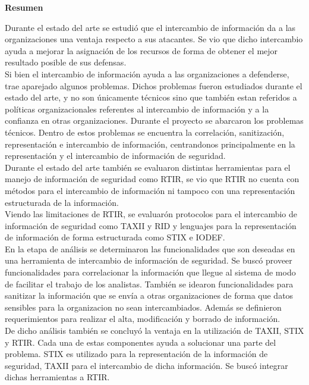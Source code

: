 {\huge \bfseries Resumen \\[0.4cm]}

Durante el estado del arte se estudió que el intercambio de información da a las organizaciones una ventaja respecto a sus atacantes. Se vio que dicho intercambio ayuda a mejorar la asignación de los recursos de forma de obtener el mejor resultado posible de sus defensas. \\

Si bien el intercambio de información ayuda a las organizaciones a defenderse, trae aparejado algunos problemas. Dichos problemas fueron estudiados durante el estado del arte, y no son únicamente técnicos sino que también estan referidos a políticas organizacionales referentes al intercambio de información y a la confianza en otras organizaciones. Durante el proyecto se abarcaron los problemas técnicos. Dentro de estos problemas se encuentra la correlación, sanitización, representación e intercambio de información, centrandonos principalmente en la representación y el intercambio de información de seguridad. \\

Durante el estado del arte también se evaluaron distintas herramientas para el manejo de información de seguridad como RTIR, se vio que RTIR no cuenta con métodos para el intercambio de información ni tampoco con una representación estructurada de la información. \\

Viendo las limitaciones de RTIR, se evaluarón protocolos para el intercambio de información de seguridad como TAXII y RID y lenguajes para la representación de información de forma estructurada como STIX e IODEF. \\

En la etapa de análisis se determinaron las funcionalidades que son deseadas en una herramienta de intercambio de información de seguridad. Se buscó proveer funcionalidades para correlacionar la información que llegue al sistema de modo de facilitar el trabajo de los analistas. También se idearon funcionalidades para sanitizar la información que se envía a otras organizaciones de forma que datos sensibles para la organizacion no sean intercambiados. Además se definieron requerimientos para realizar el alta, modificación y borrado de información. \\

De dicho análisis también se concluyó la ventaja en la utilización de TAXII, STIX y RTIR. Cada una de estas componentes ayuda a solucionar una parte del problema. STIX es utilizado para la representación de la información de seguridad, TAXII para el intercambio de dicha información. Se buscó integrar dichas herramientas a RTIR. \\

